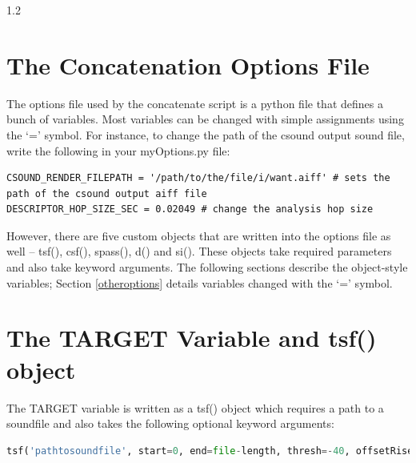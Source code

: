 \documentclass{article}
\begin{document}
\begin{spacing}{1.2}
\section{The Concatenation Options File}
The options file used by the concatenate script is a python file that defines a bunch of variables.  Most variables can be changed with simple assignments using the `=' symbol.  For instance, to change the path of the csound output sound file, write the following in your myOptions.py file:
\begin{lstlisting}
CSOUND_RENDER_FILEPATH = '/path/to/the/file/i/want.aiff' # sets the path of the csound output aiff file
DESCRIPTOR_HOP_SIZE_SEC = 0.02049 # change the analysis hop size
\end{lstlisting}


However, there are five custom objects that are written into the options file as well -- tsf(), csf(), spass(), d() and si().  These objects take required parameters and also take keyword arguments.  The following sections describe the object-style variables; Section \ref{otheroptions} details variables changed with the `=' symbol.

\section{The TARGET Variable and tsf() object}\label{target}
The TARGET variable is written as a tsf() object which requires a path to a soundfile and also takes the following optional keyword arguments:

\begin{lstlisting}[language=python]
tsf('pathtosoundfile', start=0, end=file-length, thresh=-40, offsetRise=1.5, offsetThreshAdd=+12, offsetThreshAbs=-80, scaleDb=0, minSegLen=0.05, maxSegLen=1000, midiPitchMethod='composite', stretch=1, segmentationFilepath=None)
\end{lstlisting}


\end{spacing}
\end{document}
